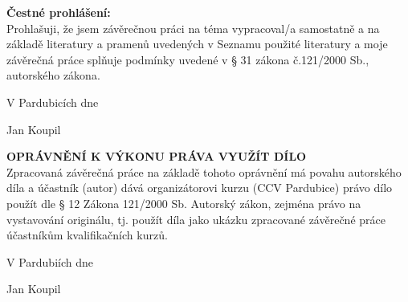 





\newpage

\vspace*{\fill}

\noindent \textbf{Čestné prohlášení:} \\

Prohlašuji, že jsem závěrečnou práci na téma \textbf{\topic}
vypracoval/a samostatně a na základě literatury a pramenů uvedených v Seznamu použité literatury a moje závěrečná práce splňuje podmínky uvedené v § 31 zákona č.121/2000 Sb., autorského zákona.

\vspace{1cm}

\hfill V Pardubicích dne \dotfill  
\vspace{1cm}

\hfill
Jan Koupil

\newpage

\vspace*{\fill}

\noindent \textbf{OPRÁVNĚNÍ K VÝKONU PRÁVA VYUŽÍT DÍLO} \\

Zpracovaná závěrečná práce na základě tohoto oprávnění má povahu autorského díla a účastník (autor) dává organizátorovi kurzu (CCV Pardubice) právo dílo použít dle § 12 Zákona 121/2000 Sb. Autorský zákon, zejména právo na vystavování originálu, tj. použít díla jako ukázku zpracované závěrečné práce účastníkům kvalifikačních kurzů.

\vspace{1cm}

\hfill V Pardubiích dne \dotfill  

\hfill
Jan Koupil

\newpage
